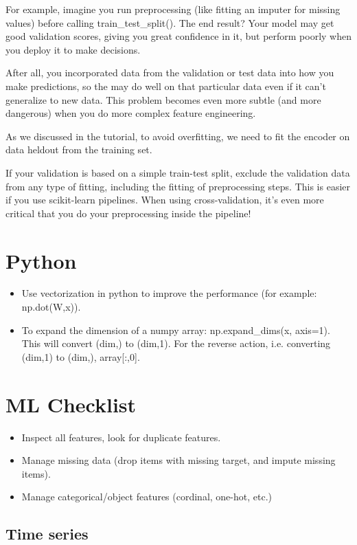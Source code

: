 \documentclass[12pt]{report}
\begin{document}
For example, imagine you run preprocessing (like fitting an imputer for missing values) before calling train\_test\_split(). The end result? Your model may get good validation scores, giving you great confidence in it, but perform poorly when you deploy it to make decisions.

After all, you incorporated data from the validation or test data into how you make predictions, so the may do well on that particular data even if it can't generalize to new data. This problem becomes even more subtle (and more dangerous) when you do more complex feature engineering.

As we discussed in the tutorial, to avoid overfitting, we need to fit the encoder on data heldout from the training set.

If your validation is based on a simple train-test split, exclude the validation data from any type of fitting, including the fitting of preprocessing steps. This is easier if you use scikit-learn pipelines. When using cross-validation, it's even more critical that you do your preprocessing inside the pipeline!


\section{Python}
\begin{itemize}
\item Use vectorization in python to improve the performance (for example: np.dot(W,x)).
\item To expand the dimension of a numpy array: np.expand\_dims(x, axis=1). This will convert (dim,) to (dim,1). For the reverse action, i.e. converting (dim,1) to (dim,), array[:,0].
\end{itemize}



\section{ML Checklist}

\begin{itemize}
  \item Inspect all features, look for duplicate features.
  \item Manage missing data (drop items with missing target, and impute missing items).
  \item Manage categorical/object features (cordinal, one-hot, etc.)
\end{itemize}
\subsection{Time series}
\end{document}
